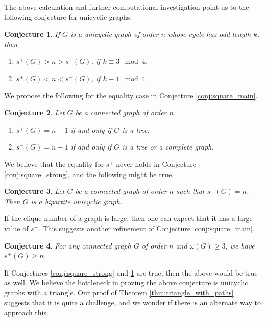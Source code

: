 \documentclass{article}
\newtheorem{conjecture}{Conjecture}[section]
\begin{document}
The above calculation and further computational investigation point us to the following conjecture for unicyclic graphs. 

\begin{conjecture}\label{conj:unicyclic}
   If $G$ is a unicyclic graph of order $n$ whose cycle has odd length $k$, then
   \begin{enumerate}[$(i)$]
       \item $s^+(G)> n > s^-(G)$, if $k\equiv 3 \mod 4$.
       \item $s^+(G)< n < s^-(G)$, if $k\equiv 1 \mod 4$.
   \end{enumerate}
\end{conjecture}

We propose the following for the equality case in Conjecture \ref{conj:square_main}. 

\begin{conjecture}\label{conj:tree_equality} Let $G$ be a connected graph of order $n$. 
\begin{enumerate}[$(i)$]
    \item $s^+(G) = n-1$ if and only if $G$ is a tree.
    \item $s^-(G) = n-1$ if and only if $G$ is a tree or a complete graph.
\end{enumerate}
\end{conjecture}

We believe that the equality for $s^+$ never holds in Conjecture \ref{conj:square_strong}, and the following might be true.

\begin{conjecture}
Let $G$ be a connected graph of order $n$ such that $s^+(G)=n$. Then $G$ is a bipartite unicyclic graph. 
\end{conjecture}

If the clique number of a graph is large, then one can expect that it has a large value of $s^+$. This suggests another refinement of Conjecture \ref{conj:square_main}. 

\begin{conjecture} For any connected graph $G$ of order $n$ and $\omega(G)\ge 3$, we have $s^+(G)\ge n$.  
\end{conjecture}

If Conjectures \ref{conj:square_strong} and \ref{conj:unicyclic} are true, then the above would be true as well. We believe the bottleneck in proving the above conjecture is unicyclic graphs with a triangle. Our proof of Theorem \ref{thm:triangle_with_paths} suggests that it is quite a challenge, and we wonder if there is an alternate way to approach this.
\end{document}
